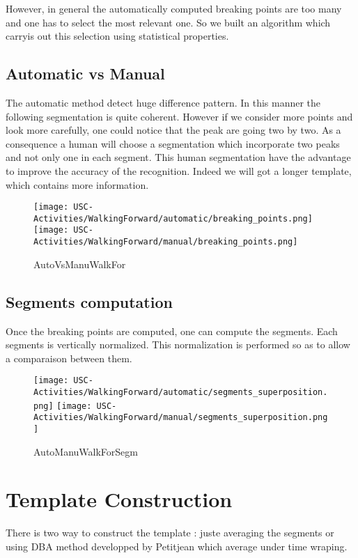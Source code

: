 \documentclass[a4,12pt]{article}
\begin{document}
		However, in general the automatically computed breaking points are too many and one has to select the most relevant one. So we built an algorithm which carryis out this selection using statistical properties.
		
	\subsection{Automatic vs Manual}
	
	The automatic method detect huge difference pattern. In this manner the following segmentation is quite coherent. However if we consider more points and look more carefully, one could notice that the peak  are going two by two. As a consequence a human will choose a segmentation which incorporate two peaks and not only one in each segment. This human segmentation have the advantage to improve the accuracy of the recognition. Indeed we will got a longer template, which contains more information. 
	
	\begin{figure}[H]
		\centering
		\texttt{[image: USC-Activities/WalkingForward/automatic/breaking\_points.png]}
		\texttt{[image: USC-Activities/WalkingForward/manual/breaking\_points.png]}
		\caption{AutoVsManuWalkFor}
		\label{Walking Forward}
	\end{figure}
		
	\subsection{Segments computation}
		
		Once the breaking points are computed, one can compute the segments. Each segments is vertically normalized. This normalization is performed so as to allow a comparaison between them.
		
	\begin{figure}[H]
		\centering
		\texttt{[image: USC-Activities/WalkingForward/automatic/segments\_superposition.png]}
		\texttt{[image: USC-Activities/WalkingForward/manual/segments\_superposition.png]}
		\caption{AutoManuWalkForSegm}
		\label{Walking Forward}
	\end{figure}
	
	\section{Template Construction}
	
	There is two way to construct the template : juste averaging the segments or using DBA method developped by Petitjean\cite{petitjean} which average under time wraping. 
	
\end{document}
